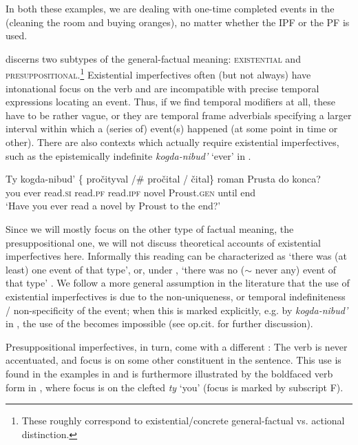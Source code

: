 \documentclass[output=paper,modfonts,newtxmath,hidelinks
\ChapterDOI{10.5281/zenodo.2545513}
]{langscibook}
\begin{document}
\noindent In both these examples, we are dealing with one-time completed events in the  (cleaning the room and buying oranges), no matter whether the IPF or the PF is used.

\citet{gronndiss} discerns two subtypes of the general-factual meaning: \textsc{existential} and \textsc{presuppositional}.\footnote{These roughly correspond to  existential/concrete general-factual vs. actional distinction.} Existential imperfectives often (but not always) have intonational focus on the verb and are incompatible with precise temporal expressions locating an event. Thus, if we find temporal modifiers at all, these have to be rather vague, or they are temporal frame adverbials specifying a larger interval within which a (series of) event(s) happened (at some point in time or other). There are also contexts which actually require existential imperfectives, such as the epistemically indefinite \textit{kogda-nibud'} `ever' in .

\ea\gll Ty kogda-nibud' \{\hspace{-2pt} pročityval /\#\hspace{-2pt} pročital / čital\} roman Prusta do konca? \\
you ever {} read.\textsc{si} {} read.\textsc{pf} {} read.\textsc{ipf} novel Proust.\textsc{gen} until end\\
\glt `Have you ever read a novel by Proust to the end?' \hfill \citep[][73]{gronndiss}\label{Proust}
\z

\noindent Since we will mostly focus on the other type of factual meaning, the presuppositional one, we will not discuss theoretical accounts of existential imperfectives here. Informally this reading can be characterized as `there was (at least) one event of that type', or, under , `there was no ($\sim$ never any) event of that type' \citep[see][]{mehlig01, mehlig13, muellerkrat, muellerPI, gehrkemueller}. We follow a more general assumption in the literature that the use of existential imperfectives is due to the non-uniqueness, or temporal indefiniteness / non-specificity of the event; when this is marked explicitly, e.g. by \textit{kogda-nibud'} in , the use of the  becomes impossible (see op.cit. for further discussion). 

Presuppositional imperfectives, in turn, come with a different : The verb is never accentuated, and  focus is on some other constituent in the sentence. This  use is found in the examples in  and is furthermore illustrated by the boldfaced verb form in , where focus is on the clefted  \textit{ty} `you' (focus is marked by subscript F).
\end{document}

